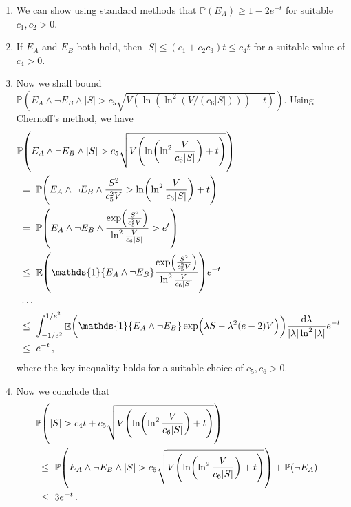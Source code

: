 \documentclass[11pt]{article}
\DeclareMathOperator{\E}{\mathbb{E}}
\renewcommand{\P}{\ensuremath{\mathbb{P}}}
\theoremstyle{remark}
\theoremstyle{definition}
\renewcommand\abs[1]{|#1|} %
\newcommand\ind[1]{\ensuremath{\mathds{1}\{#1\}}}
\newcommand\Parens[1]{\mleft(#1\mright)}
\begin{document}
\begin{enumerate}
  \item
    We can show using standard methods that $\P(E_A) \geq 1-2e^{-t}$
    for suitable $c_1, c_2 > 0$.

  \item
    If $E_A$ and $E_B$ both hold, then $|S| \leq (c_1 + c_2c_3) t \leq
    c_4 t$ for a suitable value of $c_4 > 0$.

  \item
    Now we shall bound $\P(E_A \wedge \neg E_B \wedge |S| > c_5
    \sqrt{V (\ln(\ln^2(V/(c_6|S|))) + t)})$.
    Using Chernoff's method, we have
    \begin{align*}
      \lefteqn{
        \P\Parens{
          E_A \wedge \neg E_B \wedge
          |S| > c_5 \sqrt{
            V \Parens{
              \ln\Parens{
                \ln^2\frac{V}{c_6|S|}
              } + t
            }
          }
        }
      } \\
      & \ = \
      \P\Parens{
        E_A \wedge \neg E_B \wedge
        \frac{S^2}{c_5^2V}
        > \ln\Parens{\ln^2\frac{V}{c_6|S|}} + t
      }
      \\
      & \ = \
      \P\Parens{
        E_A \wedge \neg E_B \wedge
        \frac{
          \exp\Parens{\frac{S^2}{c_5^2V}}
        }{
          \ln^2\frac{V}{c_6|S|}
        }
        > e^t
      }
      \\
      & \ \leq \
      \E\Parens{
        \ind{E_A \wedge \neg E_B}
        \frac{
          \exp\Parens{\frac{S^2}{c_5^2V}}
        }{
          \ln^2\frac{V}{c_6|S|}
        }
      }
      e^{-t}
      \\
      & \ \dotsb \
      \\
      & \ \leq \
      \int_{-1/e^2}^{1/e^2}
      \E\Parens{
        \ind{E_A \wedge \neg E_B}
        \exp\Parens{ \lambda S - \lambda^2 (e-2) V }
      }
      \frac{\dif\lambda}{\abs{\lambda}\ln^2\abs{\lambda}}
      e^{-t}
      \\
      & \ \leq \
      e^{-t}
      \,,
    \end{align*}
    where the key inequality holds for a suitable choice of $c_5, c_6
    > 0$.

  \item
    Now we conclude that
    \begin{align*}
      \lefteqn{
        \P\Parens{
          |S| >
          c_4 t +
          c_5 \sqrt{
            V \Parens{
              \ln\Parens{
                \ln^2\frac{V}{c_6|S|}
              } + t
            }
          }
        }
      } \\
      & \ \leq \
      \P\Parens{
        E_A \wedge
        \neg E_B \wedge
        |S| >
        c_5 \sqrt{
          V \Parens{
            \ln\Parens{
              \ln^2\frac{V}{c_6|S|}
            } + t
          }
        }
      }
      + \P(\neg E_A)
      \\
      & \ \leq \
      3e^{-t}
      \,.
    \end{align*}

\end{enumerate}
\end{document}
